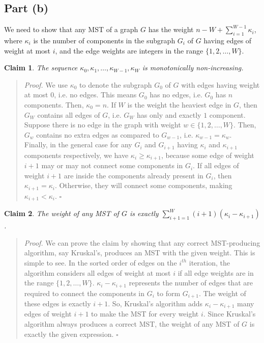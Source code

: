 \documentclass[9pt]{article}
\newtheorem{claim}{Claim}
\begin{document}
\subsection*{Part (b)}
We need to show that any MST of a graph $G$ has the weight $n - W + \sum_{i=1}^{W-1} \kappa_{i}$,
where $\kappa_{i}$ is the number of components in the subgraph $G_{i}$ of $G$ having edges of weight
at most $i$, and the edge weights are integers in the range $\{ 1, 2, \dots, W \}$.
\begin{claim}
    \label{claim:kappa-sequence}
    The sequence $\kappa_{0}, \kappa_{1}, \dots, \kappa_{W-1}, \kappa_{W}$ is monotonically
    non-increasing.
\end{claim}
\begin{quote}
\textit{Proof.}
We use $\kappa_{0}$ to denote the subgraph $G_{0}$ of $G$ with edges having weight at most $0$,
i.e. no edges. This means $G_{0}$ has no edges, i.e. $G_{0}$ has $n$ components. Then,
$\kappa_{0} = n$. If $W$ is the weight the heaviest edge in $G$, then $G_{W}$ contains all
edges of $G$, i.e. $G_{W}$ has only and exactly $1$ component. \\
Suppose there is no edge in the graph with weight $w \in \{ 1, 2, \dots, W \}$. Then, $G_{w}$
contains no extra edges as compared to $G_{w-1}$, i.e. $\kappa_{w-1} = \kappa_{w}$. \\
Finally, in the general case for any $G_{i}$ and $G_{i+1}$ having $\kappa_{i}$ and
$\kappa_{i+1}$ components respectively, we have $\kappa_{i} \geq \kappa_{i+1}$, because some
edge of weight $i+1$ may or may not connect some components in $G_{i}$. If all edges of weight
$i+1$ are inside the components already present in $G_{i}$, then $\kappa_{i+1} = \kappa_{i}$.
Otherwise, they will connect some components, making $\kappa_{i+1} < \kappa_{i}$.
\hfill $\square$
\end{quote}
\begin{claim}
    \label{claim:weight-MST}
    The weight of any MST of $G$ is exactly $\sum_{i+1=1}^{W} (i + 1) (\kappa_{i} - \kappa_{i+1})$.
\end{claim}
\begin{quote}
\textit{Proof.}
We can prove the claim by showing that any correct MST-producing algorithm, say Kruskal's, produces
an MST with the given weight. This is simple to see. In the sorted order of edges on the $i^{th}$
iteration, the algorithm considers all edges of weight at most $i$ if all edge weights are in the
range $\{ 1, 2, \dots, W \}$. $\kappa_{i} - \kappa_{i+1}$ represents the number of edges that are
required to connect the components in $G_{i}$ to form $G_{i+1}$. The weight of these edges is
exactly $i+1$. So, Kruskal's algorithm adds $\kappa_{i} - \kappa_{i+1}$ many edges of weight $i+1$
to make the MST for every weight $i$.
Since Kruskal's algorithm always produces a correct MST, the weight of any MST of $G$ is exactly
the given expression.
\hfill $\square$
\end{quote}
\end{document}
